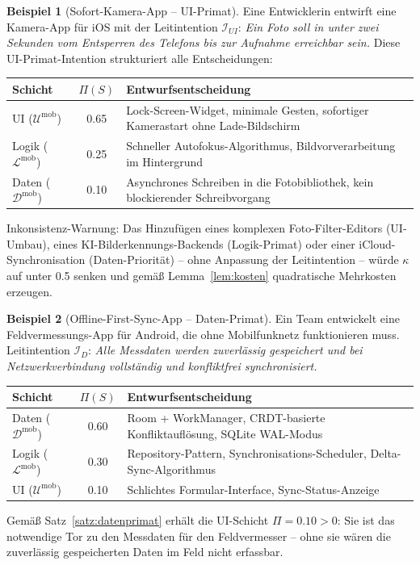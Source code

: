 ﻿\documentclass[a4paper,12pt]{article}
\theoremstyle{definition}
\newtheorem{beispiel}{Beispiel}
\begin{document}
\begin{beispiel}[Sofort-Kamera-App -- UI-Primat]\label{bsp:kamera}
Eine Entwicklerin entwirft eine Kamera-App für iOS mit der Leitintention
$\mathcal{I}_{UI}$: \textit{\glqq{}Ein Foto soll in unter zwei Sekunden vom
Entsperren des Telefons bis zur Aufnahme erreichbar sein.\grqq{}} Diese
UI-Primat-Intention strukturiert alle Entscheidungen:

\begin{center}
\begin{tabular}{lcp{5.5cm}}
\toprule
Schicht & $\Pi(S)$ & Entwurfsentscheidung \\
\midrule
UI ($\mathcal{U}^{\text{mob}}$) & 0.65 & Lock-Screen-Widget, minimale
Gesten, sofortiger Kamerastart ohne Lade-Bildschirm \\
Logik ($\mathcal{L}^{\text{mob}}$) & 0.25 & Schneller Autofokus-Algorithmus,
Bildvorverarbeitung im Hintergrund \\
Daten ($\mathcal{D}^{\text{mob}}$) & 0.10 & Asynchrones Schreiben in die
Fotobibliothek, kein blockierender Schreibvorgang \\
\bottomrule
\end{tabular}
\end{center}

Inkonsistenz-Warnung: Das Hinzufügen eines komplexen Foto-Filter-Editors
(UI-Umbau), eines KI-Bilderkennungs-Backends (Logik-Primat) oder einer
iCloud-Synchronisation (Daten-Priorität) -- ohne Anpassung der
Leitintention -- würde $\kappa$ auf unter 0.5 senken und gemäß
Lemma~\ref{lem:kosten} quadratische Mehrkosten erzeugen.
\end{beispiel}

\begin{beispiel}[Offline-First-Sync-App -- Daten-Primat]\label{bsp:sync}
Ein Team entwickelt eine Feldvermessungs-App für Android, die ohne
Mobilfunknetz funktionieren muss. Leitintention $\mathcal{I}_D$:
\textit{\glqq{}Alle Messdaten werden zuverlässig gespeichert und bei
Netzwerkverbindung vollständig und konfliktfrei synchronisiert.\grqq{}}

\begin{center}
\begin{tabular}{lcp{5.5cm}}
\toprule
Schicht & $\Pi(S)$ & Entwurfsentscheidung \\
\midrule
Daten ($\mathcal{D}^{\text{mob}}$) & 0.60 & Room + WorkManager, CRDT-basierte
Konfliktauflösung, SQLite WAL-Modus \\
Logik ($\mathcal{L}^{\text{mob}}$) & 0.30 & Repository-Pattern,
Synchronisations-Scheduler, Delta-Sync-Algorithmus \\
UI ($\mathcal{U}^{\text{mob}}$) & 0.10 & Schlichtes Formular-Interface,
Sync-Status-Anzeige \\
\bottomrule
\end{tabular}
\end{center}

Gemäß Satz~\ref{satz:datenprimat} erhält die UI-Schicht $\Pi = 0.10 > 0$:
Sie ist das notwendige Tor zu den Messdaten für den Feldvermesser --
ohne sie wären die zuverlässig gespeicherten Daten im Feld nicht erfassbar.
\end{beispiel}
\end{document}
